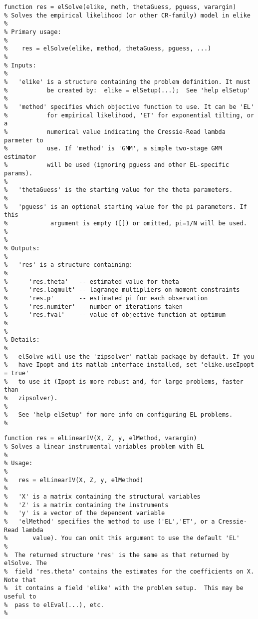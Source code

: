 
\begin{lstlisting}[commentstyle=\ttfamily]
function res = elSolve(elike, meth, thetaGuess, pguess, varargin)
% Solves the empirical likelihood (or other CR-family) model in elike
%
% Primary usage:
%
%    res = elSolve(elike, method, thetaGuess, pguess, ...)
%
% Inputs:
% 
%   'elike' is a structure containing the problem definition. It must
%           be created by:  elike = elSetup(...);  See 'help elSetup'
%
%   'method' specifies which objective function to use. It can be 'EL'
%           for empirical likelihood, 'ET' for exponential tilting, or a
%           numerical value indicating the Cressie-Read lambda parmeter to
%           use. If 'method' is 'GMM', a simple two-stage GMM estimator
%           will be used (ignoring pguess and other EL-specific params).
%            
%   'thetaGuess' is the starting value for the theta parameters.
%
%   'pguess' is an optional starting value for the pi parameters. If this
%            argument is empty ([]) or omitted, pi=1/N will be used.
%
%
% Outputs:
%
%   'res' is a structure containing:
%
%      'res.theta'   -- estimated value for theta
%      'res.lagmult' -- lagrange multipliers on moment constraints
%      'res.p'       -- estimated pi for each observation
%      'res.numiter' -- number of iterations taken
%      'res.fval'    -- value of objective function at optimum
%
%
% Details:
%
%   elSolve will use the 'zipsolver' matlab package by default. If you
%   have Ipopt and its matlab interface installed, set 'elike.useIpopt = true'
%   to use it (Ipopt is more robust and, for large problems, faster than
%   zipsolver).
%
%   See 'help elSetup' for more info on configuring EL problems.
%   
\end{lstlisting}


\begin{lstlisting}[commentstyle=\ttfamily]
function res = elLinearIV(X, Z, y, elMethod, varargin)
% Solves a linear instrumental variables problem with EL
%
% Usage:
%
%   res = elLinearIV(X, Z, y, elMethod)
%
%   'X' is a matrix containing the structural variables
%   'Z' is a matrix containing the instruments
%   'y' is a vector of the dependent variable
%   'elMethod' specifies the method to use ('EL','ET', or a Cressie-Read lambda
%       value). You can omit this argument to use the default 'EL'
%
%  The returned structure 'res' is the same as that returned by elSolve. The
%  field 'res.theta' contains the estimates for the coefficients on X. Note that
%  it contains a field 'elike' with the problem setup.  This may be useful to
%  pass to elEval(...), etc.
%
\end{lstlisting}

